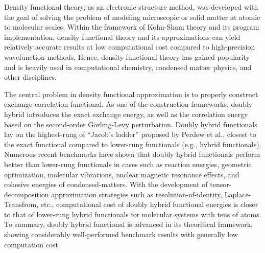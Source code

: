\begin{abstract*}

Density functional theory, as an electronic structure method, was developed with the goal of solving the problem of modeling microscopic or solid matter at atomic to molecular scales. Within the framework of Kohn-Sham theory and its program implementation, density functional theory and its approximations can yield relatively accurate results at low computational cost compared to high-precision wavefunction methods. Hence, density functional theory has gained popularity and is heavily used in computational chemistry, condensed matter physics, and other disciplines.

The central problem in density functional approximation is to properly construct exchange-correlation functional. As one of the construction frameworks, doubly hybrid introduces the exact exchange energy, as well as the correlation energy based on the second-order Görling-Levy perturbation. Doubly hybrid functionals lay on the highest-rung of ``Jacob's ladder'' proposed by Perdew et al., closest to the exact functional compared to lower-rung functionals (e.g., hybrid functionals). Numerous recent benchmarks have shown that doubly hybrid functionals perform better than lower-rung functionals in cases such as reaction energies, geometric optimization, molecular vibrations, nuclear magnetic resonance effects, and cohesive energies of condensed-matters. With the development of tensor-decomposition approximation strategies such as resolution-of-identity, Laplace-Transfrom, etc., computational cost of doubly hybrid functional energies is closer to that of lower-rung hybrid functionals for molecular systems with tens of atoms. To summary, doubly hybrid functional is advanced in its theoritical framework, showing considerably well-performed benchmark results with generally low computation cost.


\end{abstract*}
